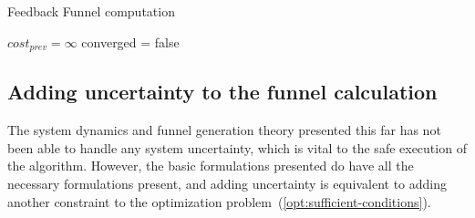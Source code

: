 \begin{algorithm}[H]
  \caption{Feedback Funnel computation}
  \label{alg:funnelalgorithm-extended}
  \DontPrintSemicolon \SetAlgoNoLine

   

  \(cost_{prev} = \infty\)\; converged = false \; \;
\end{algorithm}


\subsection{Adding uncertainty to the funnel calculation}
\label{sec:adding-uncertainty}

The system dynamics and funnel generation theory presented this far has not been
able to handle any system uncertainty, which is vital to the safe execution of
the \rrtfunnel{} algorithm. However, the basic formulations presented do have
all the necessary formulations present, and adding uncertainty is equivalent to
adding another constraint to the optimization
problem~(\ref{opt:sufficient-conditions}).

